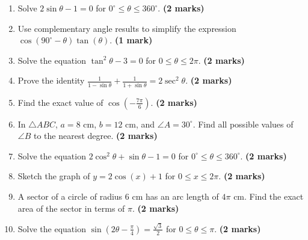 \documentclass[11pt,a4paper]{article}
\begin{document}
\begin{enumerate}
    \item Solve $2\sin \theta - 1 = 0$ for $0^\circ \le \theta \le 360^\circ$. \hfill \textbf{(2 marks)}
    \vspace{0.5cm}

    \item Use complementary angle results to simplify the expression $\cos(90^\circ - \theta)\tan(\theta)$. \hfill \textbf{(1 mark)}
    \vspace{0.5cm}

    \item Solve the equation $\tan^2 \theta - 3 = 0$ for $0 \le \theta \le 2\pi$. \hfill \textbf{(2 marks)}
    \vspace{0.5cm}

    \item Prove the identity $\frac{1}{1 - \sin \theta} + \frac{1}{1 + \sin \theta} = 2\sec^2 \theta$. \hfill \textbf{(2 marks)}
    \vspace{0.5cm}

    \item Find the exact value of $\cos\left(-\frac{7\pi}{6}\right)$. \hfill \textbf{(2 marks)}
    \vspace{0.5cm}

    \item In $\triangle ABC$, $a = 8\text{ cm}$, $b = 12\text{ cm}$, and $\angle A = 30^\circ$. Find all possible values of $\angle B$ to the nearest degree. \hfill \textbf{(2 marks)}
    \vspace{0.5cm}

    \item Solve the equation $2\cos^2 \theta + \sin \theta - 1 = 0$ for $0^\circ \le \theta \le 360^\circ$. \hfill \textbf{(2 marks)}
    \vspace{0.5cm}

    \item Sketch the graph of $y = 2\cos(x) + 1$ for $0 \le x \le 2\pi$. \hfill \textbf{(2 marks)}
    \vspace{0.5cm}

    \item A sector of a circle of radius $6\text{ cm}$ has an arc length of $4\pi\text{ cm}$. Find the exact area of the sector in terms of $\pi$. \hfill \textbf{(2 marks)}
    \vspace{0.5cm}

    \item Solve the equation $\sin\left(2\theta - \frac{\pi}{4}\right) = \frac{\sqrt{3}}{2}$ for $0 \le \theta \le \pi$. \hfill \textbf{(2 marks)}
    \vspace{0.5cm}


\end{enumerate}
\end{document}
